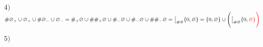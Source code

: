 \documentclass{article}
\begin{document}
\begin{itemize}
    highest 14-th category of so $\overset{\text{absolute}}{\text{own smallest}}$ unlimited state a\newline for $\cup^15$ of so smaller 15 dimensions as fictive absolute states \newline of their $\overset{\text{larger approximative}}{\text{so  \guillemotleft real\guillemotright {} relative}}$ ones $\cup^{14} : \cup^{14}_1: (\ )^{14}_1 (\cup),$ for $6)$;
    \item[$4)$] $\#\varnothing_+ \cup \varnothing_+ \cup\# \varnothing_-\cup \varnothing_- = \#_+\varnothing\cup\#\#_+ \varnothing \cup \#_- \varnothing\cup \#_-\varnothing\cup \#\#_- \varnothing  = \bigl[_{\#\varnothing} \{0,\varnothing\} = \{0,\varnothing\} \cup \Biggl(\bigl[_{\#\varnothing} \{0, \color{red}{\varnothing\} \Biggr)} $
    \item[$5)$] 
\end{itemize}
\end{document}
